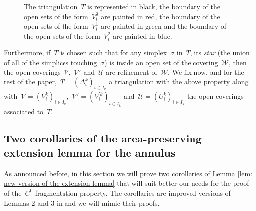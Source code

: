 \documentclass[10pt]{amsart}
\begin{document}
\begin{figure}[!ht]
	\caption{The triangulation~$T$ is represented in black, the boundary of the open sets of the form~$V_i^0$ are painted in red, the boundary of the open sets of the form~$V_i^1$ are painted in green and the boundary of the open sets of the form~$V_i^2$ are painted in blue.}
	\label{fig: covering associated to a triangulation}
\end{figure}

Furthermore, if~$T$ is chosen such that for any simplex~$\sigma$ in~$T$, its \textit{star} (the union of all of the simplices touching~$\sigma$) is inside an open set of the covering~$\mathcal{W}$, then the open coverings~$\mathcal{V}$,~$\mathcal{V'}$ and~$\mathcal{U}$ are refinement of~$\mathcal{W}$. We fix now, and for the rest of the paper,~$T=(\Delta_i^k)_{i \in I_k}$ a triangulation with the above property along with~$\mathcal{V}=(V_i^k)_{i\in I_k}$,~$\mathcal{V'}=(V_i^{'k})_{i\in I_k}$ and~$\mathcal{U}=(U_i^k)_{i\in I_k}$ the open coverings associated to~$T$.


\subsection{Two corollaries of the area-preserving extension lemma for the annulus}\label{subsec: 2 coro}

As announced before, in this section we will prove two corollaries of Lemma \ref{lem: new version of the extension lemma} that will suit better our needs for the proof of the~$C^0$-fragmentation property. The corollaries are improved versions of Lemmas 2 and 3 in \cite[section 1.6.1]{EPP} and we will mimic their proofs.
\end{document}
